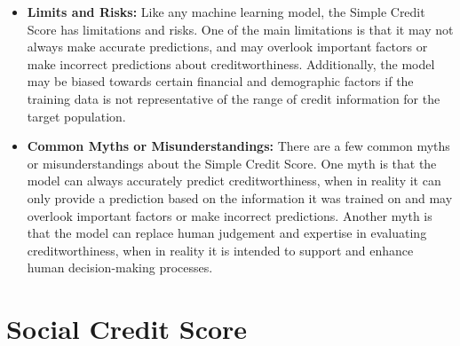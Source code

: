 \begin{itemize}
    \item \textbf{Limits and Risks:} Like any machine learning model, the Simple Credit Score has limitations and risks. One of the main limitations is that it may not always make accurate predictions, and may overlook important factors or make incorrect predictions about creditworthiness. Additionally, the model may be biased towards certain financial and demographic factors if the training data is not representative of the range of credit information for the target population.
    \item \textbf{Common Myths or Misunderstandings:} There are a few common myths or misunderstandings about the Simple Credit Score. One myth is that the model can always accurately predict creditworthiness, when in reality it can only provide a prediction based on the information it was trained on and may overlook important factors or make incorrect predictions. Another myth is that the model can replace human judgement and expertise in evaluating creditworthiness, when in reality it is intended to support and enhance human decision-making processes.
\end{itemize}

\section{Social Credit Score}

